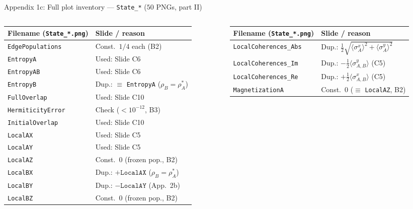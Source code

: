 \documentclass[aspectratio=169,11pt]{beamer}
\begin{document}
\begin{frame}{Appendix 1c: Full plot inventory --- \texttt{State\_*} ($50$ PNGs, part II)}
\scriptsize\setlength{\tabcolsep}{3pt}
\begin{columns}[T,totalwidth=\textwidth]
\begin{column}{0.49\textwidth}
\begin{tabular}{@{}ll@{}}
\toprule
Filename (\texttt{State\_*.png}) & Slide / reason \\\midrule
\texttt{EdgePopulations} & Const.\ $1/4$ each (B2) \\
\texttt{EntropyA} & Used: Slide C6 \\
\texttt{EntropyAB} & Used: Slide C6 \\
\texttt{EntropyB} & Dup.: $\equiv$ \texttt{EntropyA} ($\rho_B=\rho_A^*$) \\
\texttt{FullOverlap} & Used: Slide C10 \\
\texttt{HermiticityError} & Check ($<10^{-12}$, B3) \\
\texttt{InitialOverlap} & Used: Slide C10 \\
\texttt{LocalAX} & Used: Slide C5 \\
\texttt{LocalAY} & Used: Slide C5 \\
\texttt{LocalAZ} & Const.\ $0$ (frozen pop., B2) \\
\texttt{LocalBX} & Dup.: $+\texttt{LocalAX}$ ($\rho_B=\rho_A^*$) \\
\texttt{LocalBY} & Dup.: $-\texttt{LocalAY}$ (App.\ 2b) \\
\texttt{LocalBZ} & Const.\ $0$ (frozen pop., B2) \\\bottomrule
\end{tabular}
\end{column}
\begin{column}{0.49\textwidth}
\begin{tabular}{@{}ll@{}}
\toprule
Filename (\texttt{State\_*.png}) & Slide / reason \\\midrule
\texttt{LocalCoherences\_Abs} & Dup.: $\frac12\sqrt{\langle\sigma_A^x\rangle^2+\langle\sigma_A^y\rangle^2}$ \\
\texttt{LocalCoherences\_Im} & Dup.: $-\frac12\langle\sigma_{A,B}^y\rangle$ (C5) \\
\texttt{LocalCoherences\_Re} & Dup.: $+\frac12\langle\sigma_{A,B}^x\rangle$ (C5) \\
\texttt{MagnetizationA} & Const.\ $0$ ($\equiv$ \texttt{LocalAZ}, B2) \\

\end{tabular}
\end{column}
\end{columns}
\end{frame}
\end{document}
